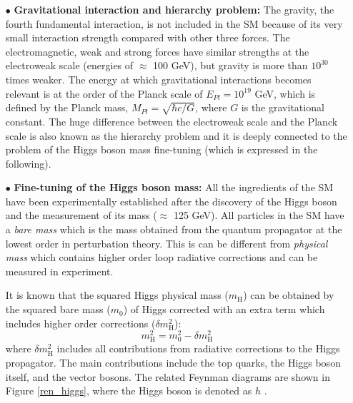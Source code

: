 \begin{enumerate}
\item[$\bullet$]\textbf{Gravitational interaction and hierarchy problem:} The gravity, the fourth fundamental interaction, is not included in the SM because of its very small interaction strength compared with other three forces. The electromagnetic, weak and strong forces have similar strengths at the electroweak scale (energies of $\approx$ 100 GeV), but gravity is more than $10^{30}$ times weaker. The energy at which gravitational interactions becomes relevant is at the order of the Planck scale of $E_{Pl} = 10^{19}$ GeV, which is defined by the Planck mass, $M_{Pl} =\sqrt{\hbar c/G}$, where $G$ is the gravitational constant. The huge difference between the electroweak scale and the Planck scale is also known as the hierarchy problem and it is deeply connected to the problem of the Higgs boson mass fine-tuning (which is expressed in the following).


\item[$\bullet$]\textbf{Fine-tuning of the Higgs boson mass:} All the ingredients of the SM have been experimentally established after the discovery of the Higgs boson and the measurement of its mass ($\approx$ 125 GeV). All particles in the SM have a \textit{bare mass} which is the mass obtained from the quantum propagator at the lowest order in perturbation theory. This is can be different from \textit{physical mass} which contains higher order loop radiative corrections and can be measured in experiment.

    It is known \cite{Martin:1997ns} that the squared Higgs physical mass ($m_\mathrm{H}$) can be obtained by the squared bare mass ($m_0$) of Higgs corrected with an extra term which includes higher order corrections ($\delta m^2_\mathrm{H}$):
\begin{equation}
m^2_\mathrm{H} = m^2_0 - \delta m^2_\mathrm{H}
\label{higgs_mass}
\end{equation}
where $\delta m^2_\mathrm{H}$ includes all contributions from radiative corrections to the Higgs propagator.
The main contributions include the top quarks, the Higgs boson itself, and the vector bosons.
The related Feynman diagrams are shown in Figure \ref{ren_higgs}, where the Higgs boson is denoted as $h$ \cite{Olive:2016xmw}.


\end{enumerate}
